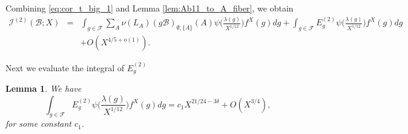 \documentclass{article}
\def\cB{{\mathcal B}}
\def\FF{{\mathcal F}}
\def\I{{\mathcal I}}
\newtheorem{lemma}[theorem]{Lemma}
\begin{document}
Combining \eqref{eq:cor_t_big_1} and Lemma \ref{lem:Ab11_to_A_fiber}, we obtain
\begin{equation}\label{eq:temp_t_big_11}
\begin{array}{rcl}
\displaystyle \I^{(2)}(\cB;X)&=&
\displaystyle\int_{g\in\FF}\sum_{A}\nu(L_{A})(g\cB)_{\emptyset;\{A\}}(A)
\psi\Big(\frac{\lambda(g)}{X^{1/12}}\Big)f^X(g)dg
+\displaystyle\int_{g\in\FF} E_g^{(2)}
\psi\Big(\frac{\lambda(g)}{X^{1/12}}\Big)f^X(g)dg
\\[.2in]&&+\displaystyle
O(X^{4/5+o(1)}).
\end{array}
\end{equation}

Next we evaluate the integral of $E_g^{(2)}$ 
\begin{lemma}\label{lem:E2}
We have
\begin{equation*}
\int_{g\in\FF} E_g^{(2)}
\psi\Big(\frac{\lambda(g)}{X^{1/12}}\Big)f^X(g)dg=c_1X^{21/24-3\delta}+O(X^{3/4}),
\end{equation*}
for some constant $c_1$.
\end{lemma}
\end{document}
